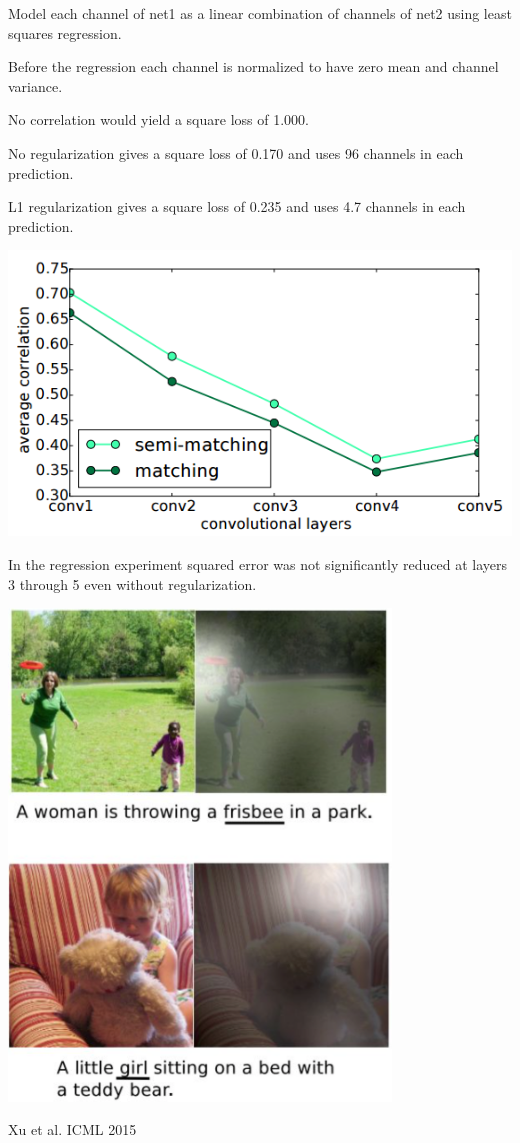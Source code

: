 {

Model each channel of net1 as a linear combination of channels of net2 using least squares regression.

\vfill
Before the regression each channel is normalized to have zero mean and channel variance.

\vfill
No correlation would yield a {\color{red} square loss of 1.000}.

\vfill
No regularization gives a {\color{red} square loss of 0.170} and uses {\color{red} 96 channels} in each prediction.

\vfill
L1 regularization gives a {\color{red} square loss of 0.235} and uses {\color{red} 4.7 channels} in each prediction.


\centerline{\includegraphics[width = 7.5in]{../images/Correlations4}}

\vfill
In the regression experiment squared error was not significantly reduced at layers 3 through 5 even without regularization. 



\centerline{\includegraphics[width = 4in]{../images/AttentionInCaptioning1}}
\centerline{Xu et al. ICML 2015}

}
